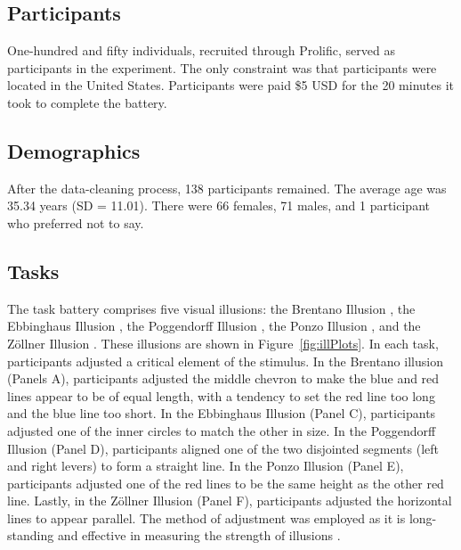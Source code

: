 \subsection*{Participants}

One-hundred and fifty individuals, recruited through Prolific, served as participants in the experiment. The only constraint was that participants were located in the United States.  Participants were paid  \$5 USD for the 20 minutes it took to complete the battery.

\subsection*{Demographics}

After the data-cleaning process, 138 participants remained. The average age was 35.34 years (SD = 11.01). There were 66 females, 71 males, and 1 participant who preferred not to say.

\subsection*{Tasks} 

The task battery comprises five visual illusions: the Brentano Illusion \parencite{Brentano.1892}, the Ebbinghaus Illusion \parencite[]{Ebbinghaus.1913}, the Poggendorff Illusion \parencite[]{Day.Dickinson.1976}, the Ponzo Illusion \parencite[]{Ponzo.1910}, and the Zöllner Illusion \parencite[]{Judd.Courten.1905}. These illusions are shown in Figure~\ref{fig:illPlots}. In each task, participants adjusted a critical element of the stimulus. In the Brentano illusion (Panels A), participants adjusted the middle chevron to make the blue and red lines appear to be of equal length, with a tendency to set the red line too long and the blue line too short. In the Ebbinghaus Illusion (Panel C), participants adjusted one of the inner circles to match the other in size. In the Poggendorff Illusion (Panel D), participants aligned one of the two disjointed segments (left and right levers) to form a straight line. In the Ponzo Illusion (Panel E), participants adjusted one of the red lines to be the same height as the other red line. Lastly, in the Zöllner Illusion (Panel F), participants adjusted the horizontal lines to appear parallel. The method of adjustment was employed as it is long-standing \parencite{Fechner.1860} and effective in measuring the strength of illusions \parencite[]{Cretenoud.etal.2021}.

